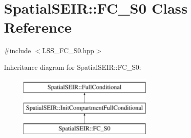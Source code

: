 \hypertarget{classSpatialSEIR_1_1FC__S0}{\section{Spatial\-S\-E\-I\-R\-:\-:F\-C\-\_\-\-S0 Class Reference}
\label{classSpatialSEIR_1_1FC__S0}
}


{\ttfamily \#include $<$L\-S\-S\-\_\-\-F\-C\-\_\-\-S0.\-hpp$>$}

Inheritance diagram for Spatial\-S\-E\-I\-R\-:\-:F\-C\-\_\-\-S0\-:\begin{figure}[H]
\begin{center}
\leavevmode
\includegraphics[height=3.000000cm]{classSpatialSEIR_1_1FC__S0}
\end{center}
\end{figure}
